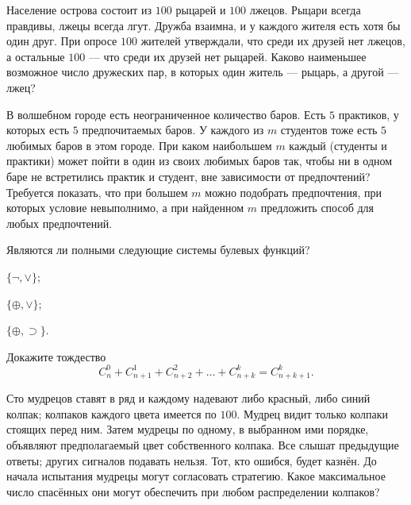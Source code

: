 

\ifPDFTeX
  \renewcommand{\rmdefault}{cmr}
\fi

\def\SheetNo{4}
\setlength{\emergencystretch}{2em}



\begin{problems}

\item Население острова состоит из $100$ рыцарей и $100$ лжецов.
Рыцари всегда правдивы, лжецы всегда лгут. Дружба взаимна, и у каждого
жителя есть хотя бы один друг. При опросе $100$ жителей утверждали,
что среди их друзей нет лжецов, а остальные $100$ --- что среди их
друзей нет рыцарей. Каково наименьшее возможное число дружеских пар,
в которых один житель --- рыцарь, а другой --- лжец?

\item В волшебном городе есть неограниченное количество баров. Есть $5$ практиков, у которых есть $5$ предпочитаемых баров. У каждого из $m$ студентов тоже есть $5$ любимых баров в этом городе. При каком наибольшем $m$ каждый (студенты и практики) может пойти в один из своих любимых баров так, чтобы ни в одном баре не встретились практик и студент, вне зависимости от предпочтений? Требуется показать, что при большем $m$ можно подобрать предпочтения, при которых условие невыполнимо, а при найденном $m$ предложить способ для любых предпочтений.

\item Являются ли полными следующие системы булевых функций?
\begin{parts}
  \item $\{\neg,\vee\}$;
  \item $\{\oplus,\vee\}$;
  \item $\{\oplus,\supset\}$.
\end{parts}

\item Докажите тождество
\[
  C_n^0+C_{n+1}^1+C_{n+2}^2+\dots+C_{n+k}^k=C_{n+k+1}^k.
\]

\item Сто мудрецов ставят в ряд и каждому надевают либо красный,
либо синий колпак; колпаков каждого цвета имеется по $100$.
Мудрец видит только колпаки стоящих перед ним. Затем мудрецы по одному,
в выбранном ими порядке, объявляют предполагаемый цвет собственного
колпака. Все слышат предыдущие ответы; других сигналов подавать нельзя.
Тот, кто ошибся, будет казнён. До начала испытания мудрецы могут
согласовать стратегию. Какое максимальное число спасённых они могут
обеспечить при любом распределении колпаков?


\end{problems}
